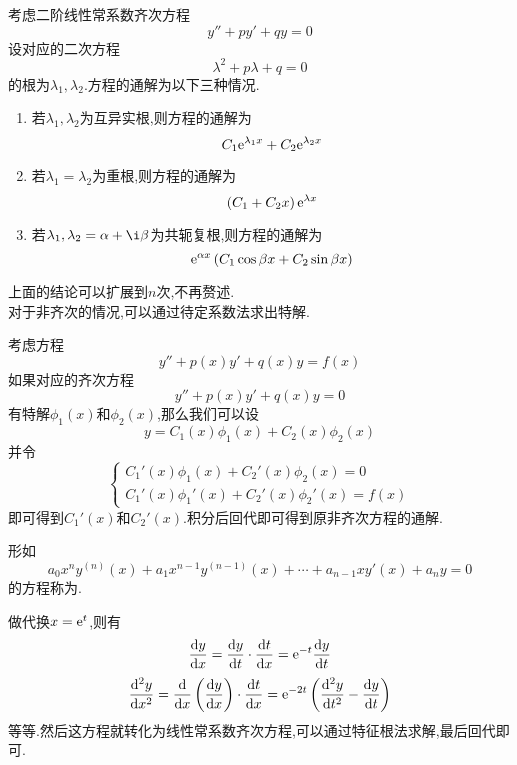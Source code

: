 \documentclass{ctexart}
\begin{document}
\begin{formal}[2.1 二阶常系数齐次方程]
    考虑二阶线性常系数齐次方程
    \[y''+py'+qy=0\]
    设对应的二次方程
    \[\lambda^2+p\lambda+q=0\]
    的根为$\lambda_1,\lambda_2$.方程的通解为以下三种情况.
    \begin{enumerate}
        \item 若$\lambda_1,\lambda_2$为互异实根,则方程的通解为
            \[C_1\mathrm{e}^{\lambda_1x}+C_2\mathrm{e}^{\lambda_2x}\]
        \item 若$\lambda_1=\lambda_2$为重根,则方程的通解为
            \[\left(C_1+C_2x\right)\mathrm{e}^{\lambda x}\]
        \item 若$\lambda_1,\lambda_2=\alpha+\i\beta$为共轭复根,则方程的通解为
            \[\mathrm{e}^{\alpha x}\left(C_1\cos\beta x+C_2\sin\beta x\right)\]
    \end{enumerate}
\end{formal}\noindent
上面的结论可以扩展到$n$次,不再赘述.\\
对于非齐次的情况,可以通过待定系数法求出特解.\\
\begin{formal}[3.1 用常数变易法求二阶线性非齐次方程]
    考虑方程
    \[y''+p(x)y'+q(x)y=f(x)\]
    如果对应的齐次方程
    \[y''+p(x)y'+q(x)y=0\]
    有特解$\phi_1(x)$和$\phi_2(x)$,那么我们可以设
    \[y=C_1(x)\phi_1(x)+C_2(x)\phi_2(x)\]
    并令
    \[\left\{\begin{array}{l}
        C_1'(x)\phi_1(x)+C_2'(x)\phi_2(x)=0\\
        C_1'(x)\phi_1'(x)+C_2'(x)\phi_2'(x)=f(x)
    \end{array}\right.\]
    即可得到$C_1'(x)$和$C_2'(x)$.积分后回代即可得到原非齐次方程的通解.
\end{formal}
\noindent{}
\begin{definition}[4.1 定义:欧拉方程]
    形如
    \[a_0x^ny^{(n)}(x)+a_1x^{n-1}y^{(n-1)}(x)+\cdots+a_{n-1}xy'(x)+a_ny=0\]
    的方程称为.
\end{definition}
\begin{formal}[4.2 欧拉方程的解法]
    做代换$x=\mathrm{e}^t$,则有
    \[\dfrac{\mathrm{d} y}{\mathrm{d} x}=\dfrac{\mathrm{d} y}{\mathrm{d} t}\cdot\dfrac{\mathrm{d} t}{\mathrm{d} x}=\mathrm{e}^{-t}\dfrac{\mathrm{d} y}{\mathrm{d} t}\]
    \[\dfrac{\mathrm{d}^2 y}{\mathrm{d} x^2}=\dfrac{\mathrm{d}}{\mathrm{d} x}\left(\dfrac{\mathrm{d} y}{\mathrm{d} x}\right)\cdot\dfrac{\mathrm{d} t}{\mathrm{d} x}=\mathrm{e}^{-2t}\left(\dfrac{\mathrm{d}^2y}{\mathrm{d} t^2}-\dfrac{\mathrm{d} y}{\mathrm{d} t}\right)\]
    等等.然后这方程就转化为线性常系数齐次方程,可以通过特征根法求解,最后回代即可.
\end{formal}
\end{document}

